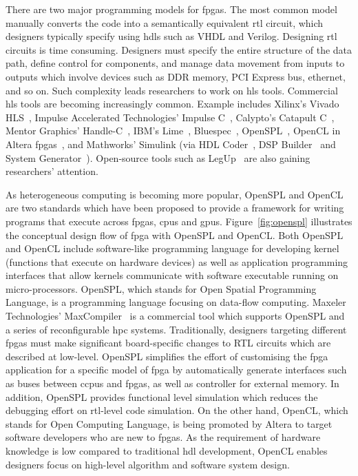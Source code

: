 There are two major programming models for \glspl{fpga}.
The most common model manually converts the code into a semantically equivalent \gls{rtl} circuit, which designers typically specify using \glspl{hdl} such as VHDL and Verilog.
Designing \gls{rtl} circuits is time consuming.
Designers must specify the entire structure of the data path, define control for components, and manage data movement from inputs to outputs which involve devices such as DDR memory, PCI Express bus, ethernet, and so on.
Such complexity leads researchers to work on \gls{hls} tools.
Commercial \gls{hls} tools are becoming increasingly common.
Example includes Xilinx's Vivado HLS~\cite{xilinxvivado}, Impulse Accelerated Technologies' Impulse C~\cite{impulsec}, Calypto's Catapult C~\cite{catapultc}, Mentor Graphics' Handle-C~\cite{handelc}, IBM's Lime~\cite{lime}, Bluespec~\cite{bluespec}, OpenSPL~\cite{openspl,maxcompiler}, OpenCL in Altera \glspl{fpga}~\cite{alteraopencl}, and Mathworks' Simulink (via HDL Coder~\cite{hdlcoder}, DSP Builder~\cite{alteradspbuilder} and System Generator~\cite{xilinxsysgen}).
Open-source tools such as LegUp~\cite{legup} are also gaining researchers' attention.

As heterogeneous computing is becoming more popular, OpenSPL and OpenCL are two standards which have been proposed to provide a framework for writing programs that execute across \glspl{fpga}, \glspl{cpu} and \glspl{gpu}.
Figure~\ref{fig:openspl} illustrates the conceptual design flow of \gls{fpga} with OpenSPL and OpenCL.
Both OpenSPL~\cite{openspl} and OpenCL include software-like programming language for developing kernel (functions that execute on hardware devices) as well as application programming interfaces that allow kernels communicate with software executable running on micro-processors.
OpenSPL, which stands for Open Spatial Programming Language, is a programming language focusing on data-flow computing.
Maxeler Technologies' MaxCompiler~\cite{maxcompiler} is a commercial tool which supports OpenSPL and a series of reconfigurable \gls{hpc} systems.
Traditionally, designers targeting different \glspl{fpga} must make significant board-specific changes to RTL circuits which are described at low-level.
OpenSPL simplifies the effort of customising the \gls{fpga} application for a specific model of \gls{fpga} by automatically generate interfaces such as buses between c\glspl{cpu} and \glspl{fpga}, as well as controller for external memory.
In addition, OpenSPL provides functional level simulation which reduces the debugging effort on \gls{rtl}-level code simulation.
On the other hand, OpenCL, which stands for Open Computing Language, is being promoted by Altera to target software developers who are new to \glspl{fpga}.
As the requirement of hardware knowledge is low compared to traditional \gls{hdl} development, OpenCL enables designers focus on high-level algorithm and software system design.

